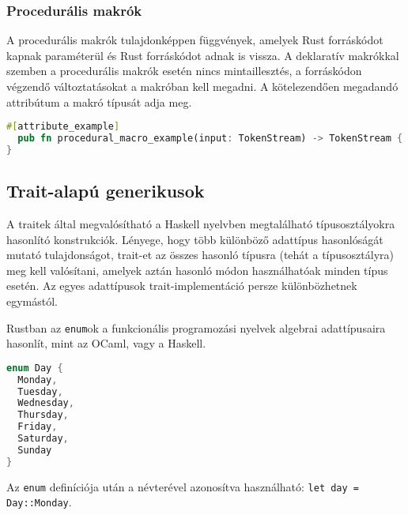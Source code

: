 \subsubsection{Procedurális makrók}
A procedurális makrók tulajdonképpen függvények, amelyek Rust forráskódot kapnak paraméterül és Rust forráskódot adnak is vissza. A deklaratív makrókkal szemben a procedurális makrók esetén nincs mintaillesztés, a forráskódon végzendő változtatásokat a makróban kell megadni. A kötelezendően megadandó attribútum a makró típusát adja meg.
\begin{lstlisting}[language=Rust, style=boxed]
#[attribute_example]
  pub fn procedural_macro_example(input: TokenStream) -> TokenStream {
}
\end{lstlisting}

\subsection{Trait-alapú generikusok}
A traitek által megvalósítható a Haskell nyelvben megtalálható típusosztályokra hasonlító konstrukciók. Lényege, hogy több különböző adattípus hasonlóságát mutató tulajdonságot, trait-et az összes hasonló típusra (tehát a típusosztályra) meg kell valósítani, amelyek aztán hasonló módon használhatóak minden típus esetén. Az egyes adattípusok trait-implementáció persze különbözhetnek egymástól.

Rustban az \lstinline{enum}ok a funkcionális programozási nyelvek algebrai adattípusaira hasonlít, mint az OCaml, vagy a Haskell.
\begin{lstlisting}[language=Rust, style=boxed]
enum Day {
  Monday,
  Tuesday,
  Wednesday,
  Thursday,
  Friday,
  Saturday,
  Sunday
}
\end{lstlisting}
Az \lstinline{enum} definíciója után a névterével azonosítva használható: \lstinline{let day = Day::Monday}.

